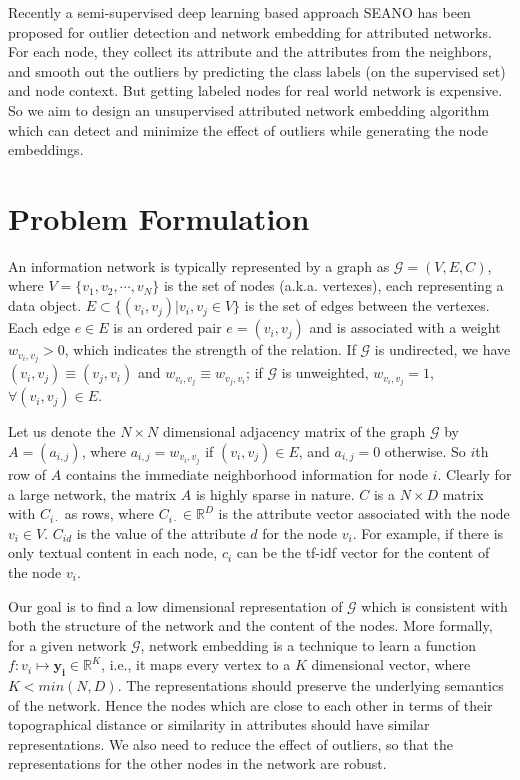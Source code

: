 \documentclass[letterpaper]{article} %
\begin{document}
Recently a semi-supervised deep learning based approach SEANO \cite{liang2018semi} has been proposed for outlier detection and network embedding for attributed networks. For each node, they collect its attribute and the attributes from the neighbors, and smooth out the outliers by predicting the class labels (on the supervised set) and node context. But getting labeled nodes for real world network is expensive. So we aim to design an unsupervised attributed network embedding algorithm which can detect and minimize the effect of outliers while generating the node embeddings.

\section{Problem Formulation} \label{sec:prob}
An information network is typically represented by a graph as $\mathcal{G} = (V, E, C)$, where $V=\{v_1, v_2,\cdots, v_N\}$ is the set of nodes (a.k.a. vertexes), each representing a data object. $E \subset \{(v_i,v_j) | v_i,v_j \in V \}$ is the set of edges between the vertexes.
Each edge $e \in E$ is an ordered pair $e = (v_i, v_j)$ and is associated with a weight $w_{v_i,v_j} > 0$, which indicates the strength of the relation. If $\mathcal{G}$ is undirected, we have $(v_i, v_j) \equiv (v_j, v_i)$ and $w_{v_i,v_j} \equiv w_{v_j,v_i}$; if $\mathcal{G}$ is unweighted, $w_{v_i,v_j} = 1$, $\forall (v_i,v_j) \in E$.

Let us denote the $N \times N$ dimensional adjacency matrix of the graph $\mathcal{G}$ by $A = (a_{i,j})$, where $a_{i,j}=w_{v_i,v_j}$ if $(v_i,v_j) \in E$, and $a_{i,j}=0$ otherwise. So $i$th row of $A$ contains the immediate neighborhood information for node $i$. Clearly for a large network, the matrix $A$ is highly sparse in nature.
$C$ is a $N \times D$ matrix with $C_{i \cdot}$ as rows, where $C_{i \cdot} \in \mathbb{R}^D$ is the attribute vector associated with the node $v_i \in V$. $C_{id}$ is the value of the attribute $d$ for the node $v_i$. For example, if there is only textual content in each node, $c_i$ can be the tf-idf vector for the content of the node $v_i$.


Our goal is to find a low dimensional representation of $\mathcal{G}$ which is consistent with both the structure of the network and the content of the nodes. More formally, for a given network $\mathcal{G}$, network embedding is a technique to learn a function $f : v_i \mapsto \mathbf{y_i} \in \mathbb{R}^K$, i.e., it maps every vertex to a $K$ dimensional vector, where $K < min(N,D)$. The representations should preserve the underlying semantics of the network. Hence the nodes which are close to each other in terms of their topographical distance or similarity in attributes should have similar representations. We also need to reduce the effect of outliers, so that the representations for the other nodes in the network are robust.
\end{document}
